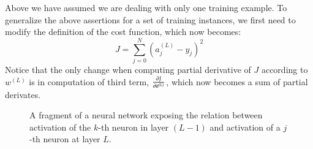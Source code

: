 \begin{refsection}
Above we have assumed we are dealing with only one training example. To generalize the above assertions for a set of training instances, we first need to modify the definition of the cost function, which now becomes:
\begin{equation}
J = \sum_{j=0}^N\left(a_j^{(L)}-y_j\right)^2
\end{equation}
Notice that the only change when computing partial derivative of $J$ according to $w^{(L)}$ is in computation of third term, $\frac{\partial J}{\partial a^{(L)}}$, which now becomes a sum of partial derivates.

\begin{figure}[htbp]
\caption{A fragment of a neural network exposing the relation between activation of the $k$-th neuron in layer $(L-1)$ and activation of a $j$-th neuron at layer $L$.}
\label{fig:network-fragment}
\end{figure}


\end{refsection}
